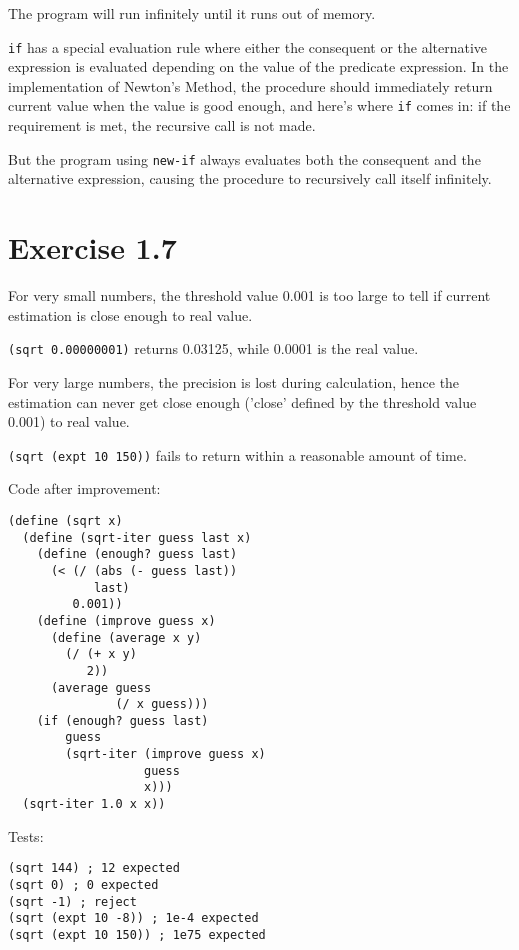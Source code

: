 \documentclass[../main.tex]{subfiles}
\begin{document}
The program will run infinitely until it runs out of memory.

\lstinline{if} has a special evaluation rule where either the consequent
 or the alternative expression is evaluated depending on the value of
 the predicate expression. In the implementation of Newton's Method,
 the procedure should immediately return current value when the value
 is good enough, and here's where \lstinline{if} comes in: if the
 requirement is met, the recursive call is not made.
 
But the program using \lstinline{new-if} always evaluates both the
 consequent and the alternative expression, causing the procedure to
 recursively call itself infinitely.

\section{Exercise 1.7}

For very small numbers, the threshold value 0.001 is too large to tell
 if current estimation is close enough to real value.

\lstinline{(sqrt 0.00000001)} returns 0.03125, while 0.0001 is the real value.

For very large numbers, the precision is lost during calculation, hence
 the estimation can never get close enough ('close' defined by the
 threshold value 0.001) to real value.

\lstinline{(sqrt (expt 10 150))} fails to return within a reasonable
 amount of time.

Code after improvement:

\begin{lstlisting}
(define (sqrt x)
  (define (sqrt-iter guess last x)
    (define (enough? guess last)
      (< (/ (abs (- guess last))
            last)
         0.001))
    (define (improve guess x)
      (define (average x y)
        (/ (+ x y)
           2))
      (average guess
               (/ x guess)))
    (if (enough? guess last)
        guess
        (sqrt-iter (improve guess x)
                   guess
                   x)))
  (sqrt-iter 1.0 x x))
\end{lstlisting}

Tests:

\begin{lstlisting}
(sqrt 144) ; 12 expected
(sqrt 0) ; 0 expected
(sqrt -1) ; reject
(sqrt (expt 10 -8)) ; 1e-4 expected
(sqrt (expt 10 150)) ; 1e75 expected
\end{lstlisting}
\end{document}
